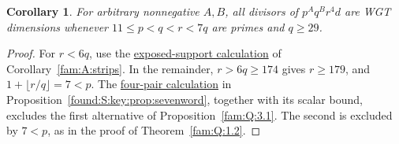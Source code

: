 \documentclass[11pt,a4paper]{article}
\numberwithin{equation}{section}
\newtheorem{corollary}[theorem]{Corollary}
\theoremstyle{remark}
\begin{document}
\begin{corollary}\label{found:S:8.2}\label{found:S:key:cor:sevenstrip}
For arbitrary nonnegative $A,B$, all divisors of $p^Aq^Br^4d$ are
WGT dimensions whenever $11\le p<q<r<7q$ are primes and $q\ge29$.
\end{corollary}
\begin{proof}
For $r<6q$, use the \href{https://github.com/sebastienpalcoux/WGT-fusion-categories/blob/f7f9f9a02f3116e61eb9dca4eebfed77001494e8/code/exposed_support.py}{exposed-support calculation} of Corollary~\ref{fam:A:strips}. In the remainder,
$r>6q\ge174$ gives $r\ge179$, and $1+\lfloor r/q\rfloor=7<p$.
The \href{https://github.com/sebastienpalcoux/WGT-fusion-categories/blob/f7f9f9a02f3116e61eb9dca4eebfed77001494e8/code/short_words.py}{four-pair calculation} in Proposition~\ref{found:S:key:prop:sevenword}, together with its scalar bound, excludes the first alternative
of Proposition~\ref{fam:Q:3.1}. The second is excluded by $7<p$, as in the proof
of Theorem~\ref{fam:Q:1.2}.
\end{proof}
\end{document}
